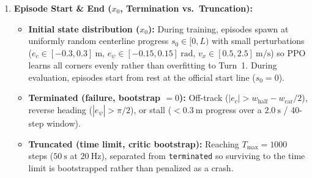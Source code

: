 \documentclass[11pt]{article}
\begin{document}
\begin{enumerate}[leftmargin=1.5em, itemsep=0.35em]
    \item \textbf{Episode Start \& End ($x_0$, Termination vs.\ Truncation):}
    \begin{itemize}[leftmargin=1.5em, itemsep=0.15em]
        \item \textbf{Initial state distribution ($x_0$):} During training, episodes spawn at uniformly random centerline progress $s_0 \in [0, L)$ with small perturbations ($e_c \in [-0.3, 0.3]~\text{m}$, $e_\psi \in [-0.15, 0.15]~\text{rad}$, $v_x \in [0.5, 2.5]~\text{m/s}$) so PPO learns all corners evenly rather than overfitting to Turn~1. During evaluation, episodes start from rest at the official start line ($s_0 = 0$).
        \item \textbf{Terminated (failure, bootstrap $= 0$):} Off-track ($|e_c| > w_{\text{half}} - w_{\text{car}}/2$), reverse heading ($|e_\psi| > \pi/2$), or stall ($< 0.3~\text{m}$ progress over a $2.0~\text{s}$ / 40-step window).
        \item \textbf{Truncated (time limit, critic bootstrap):} Reaching $T_{\max} = 1000$ steps ($50~\text{s}$ at $20~\text{Hz}$), separated from \texttt{terminated} so surviving to the time limit is bootstrapped rather than penalized as a crash.
    \end{itemize}
\end{enumerate}

\end{document}
